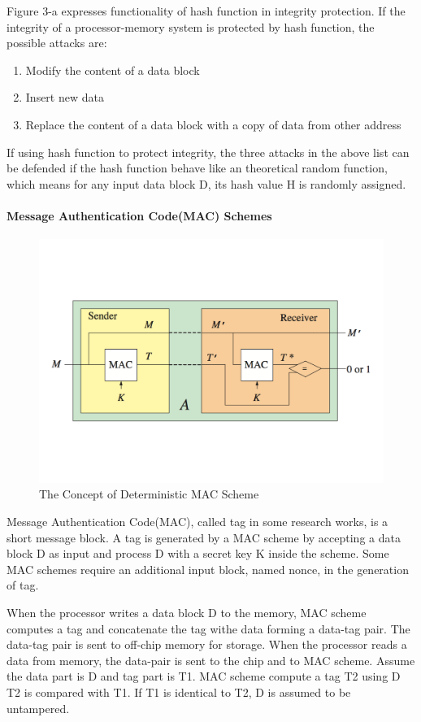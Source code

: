 \documentclass{article}
\begin{document}
Figure 3-a expresses functionality of hash function in integrity protection.
If the integrity of a processor-memory system is protected by hash function, the possible attacks are:
\begin{enumerate}
	\item Modify the content of a data block
	\item Insert new data
	\item Replace the content of a data block with a copy of data from other address
\end{enumerate}
If using hash function to protect integrity, the three attacks in the above list can be defended if the hash function behave like an theoretical random function, which means for any input data block D, its hash value H is randomly assigned.

\paragraph{Message Authentication Code(MAC) Schemes}
\begin{figure}[htbp]
\centering
\includegraphics[scale=0.4]{./diagrams/MAC.pdf}
\caption{The Concept of Deterministic MAC Scheme}
\label{deterministic_mac }
\end{figure}
Message Authentication Code(MAC), called tag in some research works, is a short message block. A tag is generated by a MAC scheme by accepting a data block D as input and process D with a secret key K inside the scheme. Some MAC schemes require an additional input block, named nonce, in the generation of tag.  

When the processor writes a data block D to the memory, MAC scheme computes a tag  and concatenate the tag withe data forming a data-tag pair. The data-tag pair is sent to off-chip memory for storage.
When the processor reads a data from memory, the data-pair is sent to the chip and to MAC scheme. Assume the data part is D and tag part is T1. MAC scheme compute a tag T2 using D T2 is compared with T1. If T1 is identical to T2, D is assumed to be untampered.
 
\end{document}

